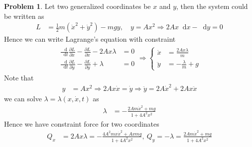 \documentclass[twoside,11pt]{article}
\newcommand{\lms}{\fontfamily{lmss}\selectfont} %
\renewcommand*\d{\mathop{}\!\mathrm{d}}
\theoremstyle{definition}
\newtheorem{problem}{\lms Problem}
\theoremstyle{remark}
\begin{document}
\begin{problem}
Let two generalized coordinates be $x$ and $y$, then the system 
could be written as
\begin{align*}
    L &= \frac{1}{2}m(\dot{x}^2 + \dot{y}^2)
    - mgy,\quad
    y = Ax^2\Rightarrow
    2Ax\d x - \d y = 0
\end{align*}
Hence we can write Lagrange's equation with constraint
\begin{align*}
    \begin{aligned}
        \frac{\d}{\d t}\frac{\partial L}{\partial\dot{x}} - 
        \frac{\partial L}{\partial x} - 2Ax\lambda&= 0\\
        \frac{\d}{\d t}\frac{\partial L}{\partial\dot{y}} - 
        \frac{\partial L}{\partial y} + \lambda &= 0
    \end{aligned}
    \Rightarrow
    \left\{
    \begin{aligned}
        \ddot{x} &= \frac{2Ax\lambda}{m}\\
        \ddot{y} &= -\frac{\lambda}{m} + g
    \end{aligned}
    \right.
\end{align*}
Note that
\begin{align*}
    y &= Ax^2\Rightarrow
    2Ax\dot{x} = \dot{y}\Rightarrow
    \ddot{y} = 2A\dot{x}^2 + 2Ax\ddot{x}
\end{align*}
we can solve $\lambda=\lambda(x,\dot{x},t)$ as
\begin{align*}
    \lambda&= -\frac{2Am\dot{x}^2 + mg}{1 + 4A^2x^2}
\end{align*}
Hence we have constraint force for two coordinates
\begin{align*}
    Q_x &= 2Ax\lambda = -\frac{4A^2mx\dot{x}^2 + Axmg}{1 + 4A^2x^2},~
    Q_y = -\lambda = 
    \frac{2Am\dot{x}^2 + mg}{1 + 4A^2x^2}
\end{align*}
\end{problem}
\end{document}
